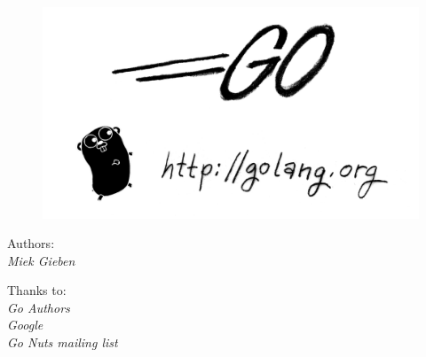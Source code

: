 \documentclass[a4paper,twoside,openleft]{blocksbook}
\begin{document}
\thispagestyle{empty}
\newcommand{\version}{0.3}
\begin{figure}[t!]
\begin{center}
    \includegraphics[scale=0.65]{fig/bumper-inverse.png}
\end{center}
\end{figure}
\vspace*{0.02\stockheight}
\begin{minipage}{0.4\textwidth}
\begin{flushleft} \large
\hspace*{2,0cm}Authors:\\
\hspace*{2.0cm}\emph{Miek Gieben}\\
\vfill
\end{flushleft}
\end{minipage}
\hspace{5mm}
\begin{minipage}{0.4\textwidth}
\begin{flushright} \large
Thanks to:\\
\emph{Go Authors}\\
\emph{Google}\\
\emph{Go Nuts mailing list}\\
\vfill
\end{flushright}
\end{minipage}
\vfill
\begin{center}
    \hspace*{1cm}\\[2.5ex]
    \hspace*{1cm}{\tiny\CcNote{\CcLongnameByNcSa}}
\newline\hspace*{1cm}{\tiny Build: \version --- \today}
\end{center}
\vspace{-3em}
\end{document}
